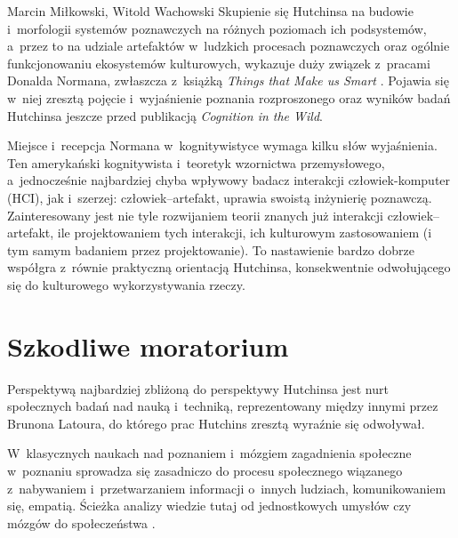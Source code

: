 \begin{artplenv2auth}{Marcin Miłkowski, Witold Wachowski}
Skupienie się Hutchinsa na budowie i~morfologii systemów poznawczych na różnych poziomach ich podsystemów, a~przez to na udziale artefaktów w~ludzkich procesach poznawczych oraz ogólnie funkcjonowaniu ekosystemów kulturowych, wykazuje duży związek z~pracami Donalda Normana, zwłaszcza z~książką \textit{Things that Make us Smart}
\parencite*[][]{salomon_distributed_1993}. %
 Pojawia się w~niej zresztą pojęcie i~wyjaśnienie poznania rozproszonego oraz wyników badań Hutchinsa jeszcze przed publikacją \textit{Cognition in the Wild}.

Miejsce i~recepcja Normana w~kognitywistyce wymaga kilku słów wyjaśnienia. Ten amerykański kognitywista i~teoretyk wzornictwa przemysłowego, a~jednocześnie najbardziej chyba wpływowy badacz interakcji człowiek-komputer (HCI), jak i~szerzej: człowiek–artefakt, uprawia swoistą inżynierię poznawczą. Zainteresowany jest nie tyle rozwijaniem teorii znanych już interakcji człowiek–artefakt, ile projektowaniem tych interakcji, ich kulturowym zastosowaniem (i tym samym badaniem przez projektowanie). To nastawienie bardzo dobrze współgra z~równie praktyczną orientacją Hutchinsa, konsekwentnie odwołującego się do kulturowego wykorzystywania rzeczy.

\section{Szkodliwe moratorium}

Perspektywą najbardziej zbliżoną do perspektywy Hutchinsa jest nurt społecznych badań nad nauką i~techniką, reprezentowany między innymi przez Brunona Latoura, do którego prac Hutchins zresztą wyraźnie się odwoływał.

W~klasycznych naukach nad poznaniem i~mózgiem zagadnienia społeczne w~poznaniu sprowadza się zasadniczo do procesu społecznego wiązanego z~nabywaniem i~przetwarzaniem informacji o~innych ludziach, komunikowaniem się, empatią. Ścieżka analizy wiedzie tutaj od jednostkowych umysłów czy mózgów do społeczeństwa
\parencite[zob. np.][]{fiske_social_2008}.%



\end{artplenv2auth}
